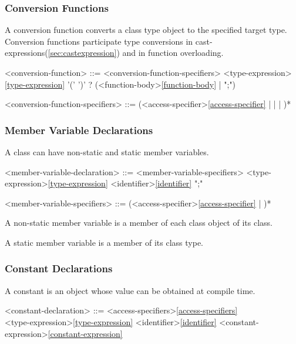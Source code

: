 \documentclass[a4paper,oneside,11pt]{article}
\begin{document}
\subsubsection{Conversion Functions}\label{sec:conversionfunctions}

A conversion function converts a class type object to the specified target type.
Conversion functions participate type conversions in cast-expressions(\ref{sec:castexpression}) and in function overloading.

\begin{grammar}
\label{conversion-function}<conversion-function> ::= <conversion-function-specifiers> 
<type-expression>\ref{type-expression} '(' ')' ? (<function-body>\ref{function-body} | ";")

<conversion-function-specifiers> ::= (<access-specifier>\ref{access-specifier} |  |  | )*
\end{grammar}

\subsubsection{Member Variable Declarations}

A class can have non-static and static member variables.

\begin{grammar}
\label{member-variable-declaration}<member-variable-declaration> ::= <member-variable-specifiers> <type-expression>\ref{type-expression} <identifier>\ref{identifier} ";"

<member-variable-specifiers> ::= (<access-specifier>\ref{access-specifier} | )*
\end{grammar}

A non-static member variable is a member of each class object of its class.

A static member variable is a member of its class type.

\subsubsection{Constant Declarations}

A constant is an object whose value can be obtained at compile time.

\begin{grammar}
\label{constant-declaration}<constant-declaration> ::= <access-specifiers>\ref{access-specifiers}\\
 <type-expression>\ref{type-expression} <identifier>\ref{identifier} \lit*{=} <constant-expression>\ref{constant-expression} \lit*{;}

\end{grammar}
\end{document}
